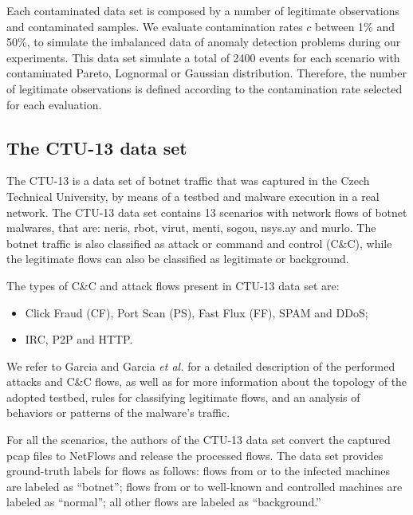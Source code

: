 \documentclass[review]{elsarticle}
\begin{document}
Each contaminated data set is composed by a number of legitimate observations and contaminated samples. We evaluate contamination rates $c$ between 1\% and 50\%, to simulate the imbalanced data of anomaly detection problems during our experiments. This data set simulate a total of 2400 events for each scenario with contaminated Pareto, Lognormal or Gaussian distribution. Therefore, the number of legitimate observations is defined according to the contamination rate selected for each evaluation.


\subsection{The CTU-13 data set}
\label{sec:3_CTU-13}

The CTU-13 \cite{garcia2014empirical} is a data set of botnet traffic that was captured in the Czech Technical University, by means of a testbed and malware execution in a real network. The CTU-13 data set contains 13 scenarios with network flows of botnet malwares, that are: neris, rbot, virut, menti, sogou, nsys.ay and murlo. The botnet traffic is also classified as attack or command and control (C\&C), while the legitimate flows can also be classified as legitimate or background.

The types of C\&C and attack flows present in CTU-13 data set are:

\begin{itemize}
	\item {} Click Fraud (CF), Port Scan (PS), Fast Flux (FF), SPAM and DDoS;
	\item {} IRC, P2P and HTTP.
\end{itemize}

We refer to Garcia \cite{garcia2014identifying} and Garcia \emph{et al.} \cite{garcia2014empirical} for a detailed description of the performed attacks and C\&C flows, as well as for more information about the topology of the adopted testbed, rules for classifying legitimate flows, and an analysis of behaviors or patterns of the malware's traffic.

For all the scenarios, the authors of the CTU-13 data set convert the captured pcap files to NetFlows and release the processed flows. The data set provides ground-truth labels for flows as follows: flows from or to the infected machines are labeled as “botnet”; flows from or to well-known and controlled machines are labeled as “normal”; all other flows are labeled as “background.”
\end{document}
